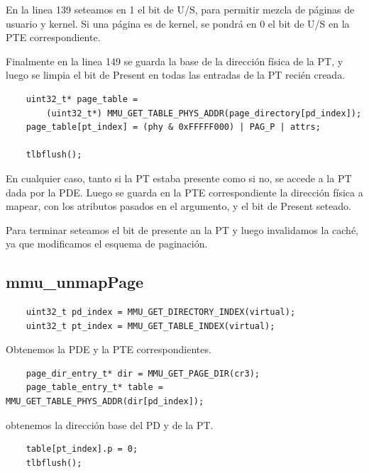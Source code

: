 \documentclass[a4paper]{article}
\newenvironment{codesnippet}{%
	\begin{Sbox}\begin{minipage}{\textwidth}\sffamily\small}%
	{\end{minipage}\end{Sbox}%
		\begin{center}%
		\vspace{-0.4cm}\colorbox{litegrey}{\TheSbox}\end{center}\vspace{0.3cm}}
\begin{document}
En la linea 139 seteamos en 1 el bit de U/S, para permitir mezcla de páginas de usuario y kernel. Si una página es de
kernel, se pondrá en 0 el bit de U/S en la PTE correspondiente.

Finalmente en la linea 149 se guarda la base de la dirección física de la PT, y luego se limpia el bit de Present en
todas las entradas de la PT recién creada.

\begin{codesnippet}
  \begin{verbatim}
    uint32_t* page_table =
        (uint32_t*) MMU_GET_TABLE_PHYS_ADDR(page_directory[pd_index]);
    page_table[pt_index] = (phy & 0xFFFFF000) | PAG_P | attrs;

    tlbflush();
  \end{verbatim}
\end{codesnippet}

En cualquier caso, tanto si la PT estaba presente como si no, se accede a la PT dada por la PDE. Luego se guarda en la
PTE correspondiente la dirección física a mapear, con los atributos pasados en el argumento, y el bit de Present
seteado.

Para terminar seteamos el bit de presente an la PT y luego invalidamos la caché, ya que modificamos el esquema de
paginación.

\subsection{mmu\_unmapPage}

\begin{codesnippet}
  \begin{verbatim}
    uint32_t pd_index = MMU_GET_DIRECTORY_INDEX(virtual);
    uint32_t pt_index = MMU_GET_TABLE_INDEX(virtual);
  \end{verbatim}
\end{codesnippet}

Obtenemos la PDE y la PTE correspondientes.

\begin{codesnippet}
  \begin{verbatim}
    page_dir_entry_t* dir = MMU_GET_PAGE_DIR(cr3);
    page_table_entry_t* table = MMU_GET_TABLE_PHYS_ADDR(dir[pd_index]);
  \end{verbatim}
\end{codesnippet}

obtenemos la dirección base del PD y de la PT.

\begin{codesnippet}
  \begin{verbatim}
    table[pt_index].p = 0;
    tlbflush();
  \end{verbatim}
\end{codesnippet}
\end{document}
